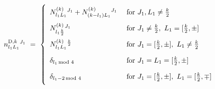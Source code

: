 \begin{equation}\label{anncoeffD}
n^{{\rm D},k}_{l_{1}L_{1}}{}^{J_{1}}\ =\ \left\{\begin{array}{ll}
N^{(k)}_{l_{1}L_{1}}{}^{J_{1}}+N^{(k)}_{(k-l_{1})L_{1}}{}^{J_{1}} &
\text{ for } J_{1},L_{1}\not= \frac{k}{2}\parbox[c][8mm][c]{0cm}{}\\
N^{(k)}_{l_{1}\frac{k}{2}}{}^{J_{1}}&
\text{ for } J_{1}\not= \frac{k}{2},\ L_{1}=[\frac{k}{2},\pm ]\parbox[c][8mm][c]{0cm}{}\\
N^{(k)}_{l_{1}L_{1}}{}^{\frac{k}{2}} &
\text{ for } J_{1}=[\frac{k}{2},\pm ],\ L_{1}\not= \frac{k}{2}\parbox[c][8mm][c]{0cm}{}\\
\delta _{l_{1}\!\!\!\mod 4}&
\text{ for } J_{1}=L_{1} = [\frac{k}{2},\pm ]\parbox[c][8mm][c]{0cm}{}\\
\delta _{l_{1}-2\!\!\! \mod 4}&
\text{ for } J_{1}= [\frac{k}{2},\pm],\ L_{1}=[\frac{k}{2},\mp]\parbox[c][8mm][c]{0cm}{}
\end{array} \right.
\end{equation}


